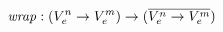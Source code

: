 \documentclass[preview]{standalone}
\begin{document}
\begin{equation*}%
\mathit{wrap} : (V^n_e \rightarrow V^m_e) \rightarrow (\wrapdf{V^n_e \rightarrow V^m_e})
\end{equation*}
\end{document}
